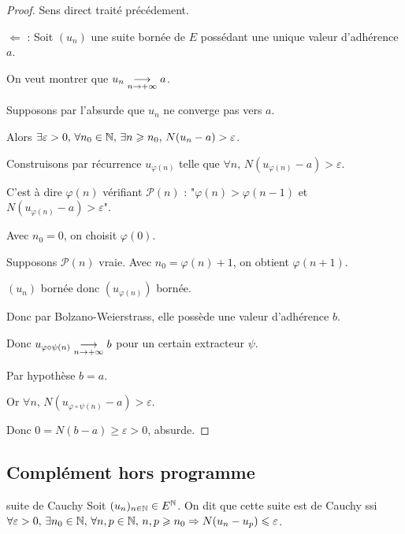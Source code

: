 
\begin{proof}
    Sens direct traité précédement. 

    $\Leftarrow$ : Soit $(u_n)$ une suite bornée de $E$ possédant une unique valeur d'adhérence $a$.

    On veut montrer que $u_n \underset{n \to +\infty}{\longrightarrow} a$.

    Supposons par l'absurde que $u_n$ ne converge pas vers $a$.

    Alors $\exists \varepsilon > 0, \, \forall n_0 \in \mathbb{N}, \, \exists n \geqslant n_0, \, N(u_n - a) > \varepsilon$.

    Construisons par récurrence $u_{\varphi(n)}$ telle que $\forall n, \, N(u_{\varphi(n)} - a) > \varepsilon$.

    C'est à dire $\varphi(n) $ vérifiant $\mathscr P(n)$ : "$\varphi(n) > \varphi(n - 1)$ et $N(u_{\varphi(n)} - a) > \varepsilon$".

    Avec $n_0 = 0$, on choisit $\varphi(0)$.

    Supposons $\mathscr P(n)$ vraie. Avec $n_0 = \varphi(n) + 1$, on obtient $\varphi(n + 1)$.

    $(u_n)$ bornée donc $(u_{\varphi(n)})$ bornée.

    Donc par Bolzano-Weierstrass, elle possède une valeur d'adhérence $b$.

    Donc $u_{\varphi \circ \psi(n)} \underset{n \to +\infty}{\longrightarrow} b$ pour un certain extracteur $\psi$.

    Par hypothèse $b = a$. 

    Or $\forall n, \, N(u_{\varphi \circ \psi(n)} - a) > \varepsilon$.

    Donc $ 0 = N(b - a) \geqslant \varepsilon > 0$, absurde. 

\end{proof}

\subsection{Complément hors programme }

\begin{definition}{suite de Cauchy}{}
    Soit $(u_n)_{n \in \mathbb{N}} \in E^{\mathbb{N}}$. On dit que cette suite est de Cauchy ssi 
    $\forall \varepsilon > 0, \, \exists n_0 \in \mathbb{N}, \, \forall n, p \in \mathbb{N}, \, n, p \geqslant n_0 \Rightarrow N(u_n - u_p) \leqslant \varepsilon$.
\end{definition}

